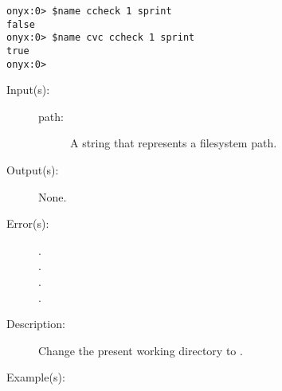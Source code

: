 \begin{description}
\begin{description}
\begin{verbatim}
onyx:0> $name ccheck 1 sprint
false
onyx:0> $name cvc ccheck 1 sprint
true
onyx:0>
		\end{verbatim}
	\end{description}
\label{systemdict:cd}
\item[{\onyxop{path}{cd}{--}}: ]
	\begin{description}\item[]
	\item[Input(s): ]
		\begin{description}\item[]
		\item[path: ]
			A string that represents a filesystem path.
		\end{description}
	\item[Output(s): ] None.
	\item[Error(s): ]
		\begin{description}\item[]
		\item[.]
		\item[.]
		\item[.]
		\item[.]
		\end{description}
	\item[Description: ]
		Change the present working directory to .
	\item[Example(s): ]\begin{verbatim}


\end{verbatim}
\end{description}
\end{description}
